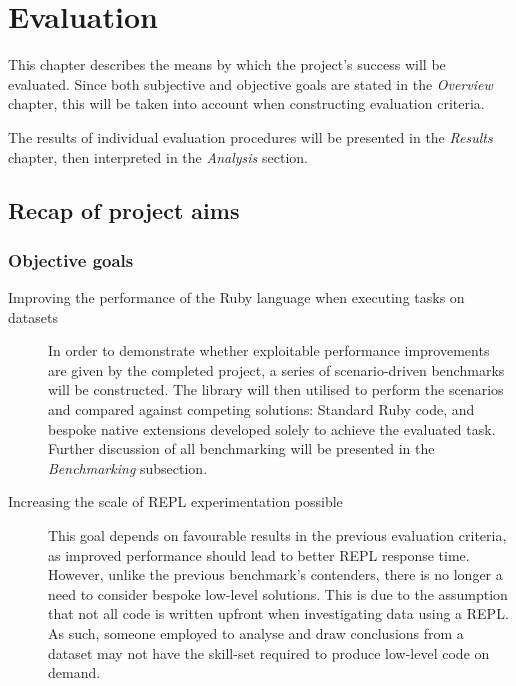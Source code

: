 \chapter{Evaluation}
This chapter describes the means by which the project's success will be evaluated.
Since both subjective and objective goals are stated in the \emph{Overview} chapter, this will be taken into account when constructing evaluation criteria.

The results of individual evaluation procedures will be presented in the \emph{Results} chapter, then interpreted in the \emph{Analysis} section.

\section{Recap of project aims}
\subsection{Objective goals}
\begin{description}
\item[Improving the performance of the Ruby language when executing tasks on datasets]
In order to demonstrate whether exploitable performance improvements are given by the completed project, a series of scenario-driven benchmarks will be constructed.
The library will then utilised to perform the scenarios and compared against competing solutions: Standard Ruby code, and bespoke native extensions developed solely to achieve the evaluated task.
Further discussion of all benchmarking will be presented in the \emph{Benchmarking} subsection.
\item[Increasing the scale of \ac{REPL} experimentation possible]
This goal depends on favourable results in the previous evaluation criteria, as improved performance should lead to better \ac{REPL} response time. However, unlike the previous benchmark's contenders, there is no longer a need to consider bespoke low-level solutions. This is due to the assumption that not all code is written upfront when investigating data using a \ac{REPL}. As such, someone employed to analyse and draw conclusions from a dataset may not have the skill-set required to produce low-level code on demand.
\end{description}

